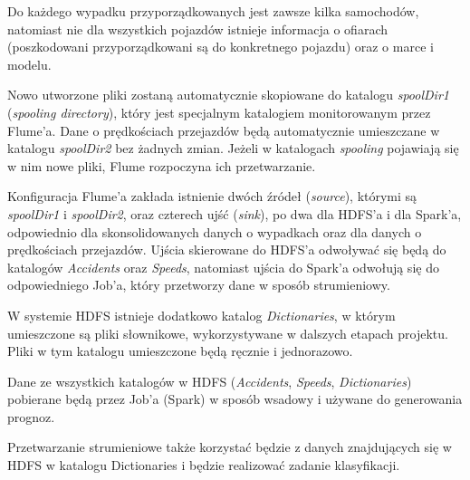 \documentclass{article}
\begin{document}
Do każdego wypadku przyporządkowanych jest zawsze kilka samochodów, natomiast nie dla wszystkich pojazdów istnieje informacja o ofiarach (poszkodowani przyporządkowani są do konkretnego pojazdu) oraz o marce i modelu.

Nowo utworzone pliki zostaną automatycznie skopiowane do katalogu \textit{spoolDir1} (\textit{spooling directory}), który jest specjalnym katalogiem monitorowanym przez Flume’a. Dane o prędkościach przejazdów będą automatycznie umieszczane w katalogu \textit{spoolDir2} bez żadnych zmian. Jeżeli w katalogach \textit{spooling} pojawiają się w nim nowe pliki, Flume rozpoczyna ich przetwarzanie.

Konfiguracja Flume’a zakłada istnienie dwóch źródeł (\textit{source}), którymi są \textit{spoolDir1} i \textit{spoolDir2}, oraz czterech ujść (\textit{sink}), po dwa dla HDFS’a i dla Spark’a, odpowiednio dla skonsolidowanych danych o wypadkach oraz dla danych o prędkościach przejazdów. Ujścia skierowane do HDFS’a odwoływać się będą do katalogów \textit{Accidents} oraz \textit{Speeds}, natomiast ujścia do Spark’a odwołują się do odpowiedniego Job’a, który przetworzy dane w sposób strumieniowy.

W systemie HDFS istnieje dodatkowo katalog \textit{Dictionaries}, w którym umieszczone są pliki słownikowe, wykorzystywane w dalszych etapach projektu. Pliki w tym katalogu umieszczone będą ręcznie i jednorazowo.  

Dane ze wszystkich katalogów w HDFS (\textit{Accidents}, \textit{Speeds}, \textit{Dictionaries}) pobierane będą przez Job’a (Spark) w sposób wsadowy i używane do generowania prognoz.

Przetwarzanie strumieniowe także korzystać będzie z danych znajdujących się w HDFS w katalogu Dictionaries i będzie realizować zadanie klasyfikacji.
\end{document}

